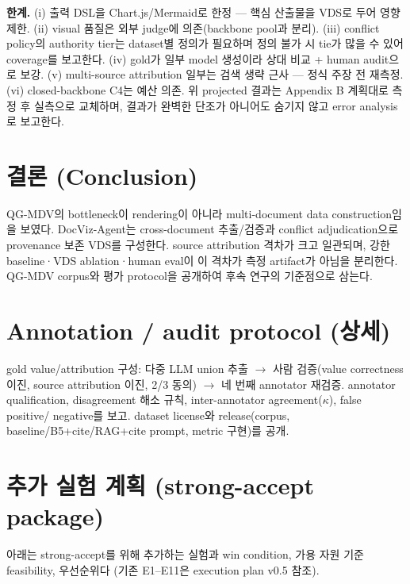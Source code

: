 \documentclass[11pt]{article}
\begin{document}
\textbf{한계.} (i) 출력 DSL을 Chart.js/Mermaid로 한정 — 핵심 산출물을 VDS로 두어 영향 제한.
(ii) visual 품질은 외부 judge에 의존(backbone pool과 분리). (iii) conflict policy의 authority
tier는 dataset별 정의가 필요하며 정의 불가 시 tie가 많을 수 있어 coverage를 보고한다. (iv) gold가
일부 model 생성이라 상대 비교 + human audit으로 보강. (v) multi-source attribution 일부는 검색
생략 근사 — 정식 주장 전 재측정. (vi) closed-backbone C4는 예산 의존. 위 projected 결과는 Appendix
B 계획대로 측정 후 실측으로 교체하며, 결과가 완벽한 단조가 아니어도 숨기지 않고 error analysis로
보고한다.

\section{결론 (Conclusion)}
QG-MDV의 bottleneck이 rendering이 아니라 multi-document data construction임을 보였다. DocViz-Agent는
cross-document 추출/검증과 conflict adjudication으로 provenance 보존 VDS를 구성한다. source
attribution 격차가 크고 일관되며, 강한 baseline·VDS ablation·human eval이 이 격차가 측정 artifact가
아님을 분리한다. QG-MDV corpus와 평가 protocol을 공개하여 후속 연구의 기준점으로 삼는다.

\appendix
\section{Annotation / audit protocol (상세)}
gold value/attribution 구성: 다중 LLM union 추출 $\rightarrow$ 사람 검증(value correctness 이진,
source attribution 이진, 2/3 동의) $\rightarrow$ 네 번째 annotator 재검증. annotator
qualification, disagreement 해소 규칙, inter-annotator agreement($\kappa$), false positive/
negative를 보고. dataset license와 release(corpus, baseline/B5+cite/RAG+cite prompt, metric
구현)를 공개.

\section{추가 실험 계획 (strong-accept package)}
아래는 strong-accept를 위해 추가하는 실험과 win condition, 가용 자원 기준 feasibility, 우선순위다
(기존 E1--E11은 execution plan v0.5 참조).
\end{document}
